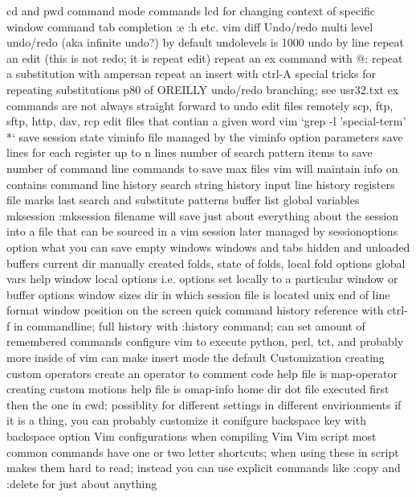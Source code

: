 \documentclass[12pt]{book}
\begin{document}
{{    cd and pwd command mode commands
      lcd for changing context of specific window
  command tab completion :e :h etc.
  vim diff
  Undo/redo
    multi level undo/redo (aka infinite undo?)
      by default undolevels is 1000
    undo by line
    repeat an edit (this is not redo; it is repeat edit)
    repeat an ex command with @:
    repeat a substitution with ampersan
    repeat an insert with ctrl-A
    special tricks for repeating substitutions p80 of OREILLY
    undo/redo branching; see usr32.txt
    ex commands are not always straight forward to undo
  edit files remotely
    scp, ftp, sftp, http, dav, rcp
  edit files that contian a given word
    vim `grep -l 'special-term' *`
  save session state
    viminfo file
      managed by the viminfo option parameters
        save lines for each register up to n lines
        number of search pattern items to save
        number of command line commands to save
        max files vim will maintain info on
      contains
        command line history
        search string history
        input line history
        registers
        file marks
        last search and substitute patterns
        buffer list
        global variables
    mksession
      :mksession filename will save just about everything about the session into a file that can be sourced in a vim session later
      managed by sessionoptions option
      what you can save
        empty windows
        windows and tabs
        hidden and unloaded buffers
        current dir
        manually created folds, state of folds, local fold options
        global vars
        help window
        local options i.e. options set locally to a particular window or buffer
        options
        window sizes
        dir in which session file is located
        unix end of line format
        window position on the screen
  quick command history reference with ctrl-f in commandline; full history with :history command; can set amount of remembered commands
  configure vim to execute python, perl, tct, and probably more inside of vim
  can make insert mode the default
Customization
  creating custom operators
    create an operator to comment code
    help file is map-operator
  creating custom motions
    help file is omap-info
  home dir dot file executed first then the one in cwd; possiblity for different settings in different envirionments
  if it is a thing, you can probably customize it
  conifgure backspace key with backspace option
  Vim configurations when compiling Vim
  Vim script
    most common commands have one or two letter shortcuts; when using these in script makes them hard to read; instead you can use explicit commands like :copy and :delete for just about anything
}}
\end{document}
